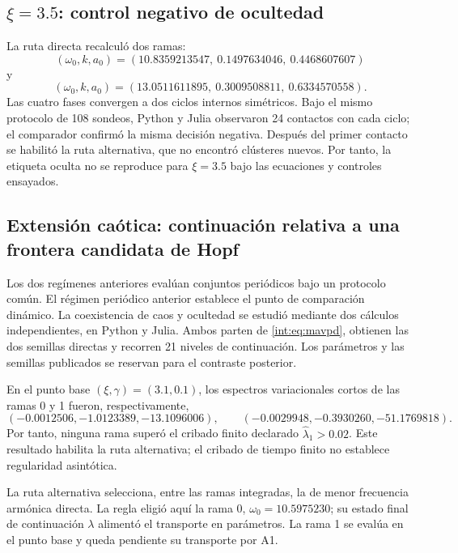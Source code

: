 \ifHAFOBasinMaterial
\subsection{\texorpdfstring{\(\xi=3.5\): control negativo de ocultedad}{xi=3.5: control negativo de ocultedad}}

La ruta directa recalculó dos ramas:
\[
(\omega_0,k,a_0)=
(10.8359213547,\ 0.1497634046,\ 0.4468607607)
\]
y
\[
(\omega_0,k,a_0)=
(13.0511611895,\ 0.3009508811,\ 0.6334570558).
\]
Las cuatro fases convergen a dos ciclos internos simétricos. Bajo el mismo
protocolo de 108 sondeos, Python y Julia observaron 24 contactos
con cada ciclo; el comparador confirmó la misma decisión negativa. Después
del primer contacto se habilitó la ruta alternativa, que no encontró clústeres
nuevos. Por tanto, la etiqueta oculta no se reproduce para \(\xi=3.5\) bajo
las ecuaciones y controles ensayados.

\fi

\subsection{Extensión caótica: continuación relativa a una frontera candidata de Hopf}
\label{int:subsec:mavpd-chaos}

\ifHAFOBasinMaterial
Los dos regímenes anteriores evalúan conjuntos periódicos bajo un protocolo
común.
\else
El régimen periódico anterior establece el punto de comparación dinámico.
\fi
La coexistencia de caos y ocultedad se estudió mediante dos cálculos
independientes, en Python y Julia. Ambos parten de \eqref{int:eq:mavpd},
obtienen las dos semillas directas y recorren 21 niveles de continuación.
Los parámetros y las semillas publicados se reservan para el contraste
posterior.

En el punto base $(\xi,\gamma)=(3.1,0.1)$, los espectros variacionales cortos
de las ramas 0 y 1 fueron, respectivamente,
\[
 (-0.0012506,-1.0123389,-13.1096006),\qquad
 (-0.0029948,-0.3930260,-51.1769818).
\]
Por tanto, ninguna rama superó el cribado finito declarado
$\widehat\lambda_1>0.02$. Este resultado habilita la ruta alternativa; el cribado de tiempo finito
no establece regularidad asintótica.

La ruta alternativa selecciona, entre las ramas integradas, la de
menor frecuencia armónica directa. La regla eligió aquí la rama 0,
$\omega_0=10.5975230$; su estado final de continuación $\lambda$ alimentó el
transporte en parámetros. La rama 1 se evalúa en el punto base y queda pendiente su transporte por A1.

